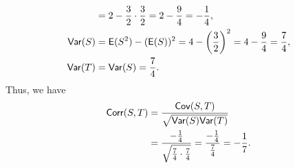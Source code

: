 \documentclass[12pt]{article}
\newcommand{\E}{{\sf E}}
\newcommand{\Var}{{\sf Var}}
\newcommand{\Cov}{{\sf Cov}}
\newcommand{\Corr}{{\sf Corr}}
\newenvironment{problem}[2][Problem]{\begin{trivlist}
\item[\hskip \labelsep {\bfseries #1}\hskip \labelsep {\bfseries #2.}]}
{\end{trivlist}}
\begin{document}
\begin{problem}{6}
\begin{enumerate}
\begin{align*}
      &= 2 - \frac{3}{2} \cdot \frac{3}{2} = 2 - \frac{9}{4} 
      = -\frac{1}{4}, \\
      \Var(S) &= \E(S^2) - (\E(S))^2 = 4 - \left(\frac{3}{2}\right)^2 
      = 4 - \frac{9}{4} = \frac{7}{4}, \\
      \Var(T) &= \Var(S) = \frac{7}{4}.
    \end{align*}
    Thus, we have
    \begin{align*}
      \Corr(S, T) &= \frac{\Cov(S, T)}{\sqrt{\Var(S) \Var(T)}} \\
      &= \frac{-\frac{1}{4}}{\sqrt{\frac{7}{4} \cdot \frac{7}{4}}} = 
      \frac{-\frac{1}{4}}{\frac{7}{4}} = -\frac{1}{7}.
    \end{align*}
  \end{enumerate}
\end{problem}
\end{document}
